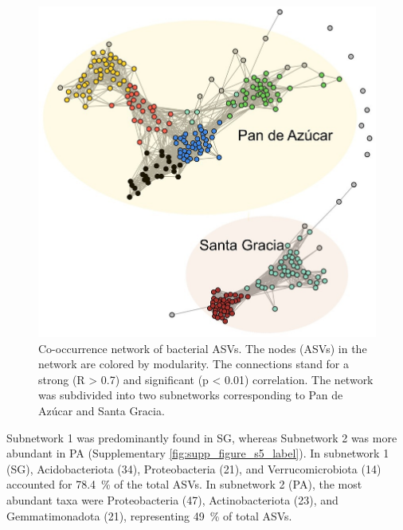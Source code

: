 \begin{figure}[H]
	\centering
	\includegraphics[width=1\textwidth]{img/M3-Figure_7.jpg}
	\caption{Co-occurrence network of bacterial ASVs. The nodes (ASVs) in the network are colored by modularity. The connections stand for a strong (R > 0.7) and significant (p < 0.01) correlation. The network was subdivided into two subnetworks corresponding to Pan de Azúcar and Santa Gracia.}
	\label{fig:M3-F7}
\end{figure}


Subnetwork 1 was predominantly found in SG, whereas Subnetwork 2 was more abundant in PA (Supplementary \cref{fig:supp_figure_s5_label}). In subnetwork 1 (SG), Acidobacteriota (34), Proteobacteria (21), and Verrucomicrobiota (14) accounted for \SI{78.4}{\percent} of the total ASVs. In subnetwork 2 (PA), the most abundant taxa were Proteobacteria (47), Actinobacteriota (23), and Gemmatimonadota (21), representing \SI{49}{\percent} of total ASVs.

